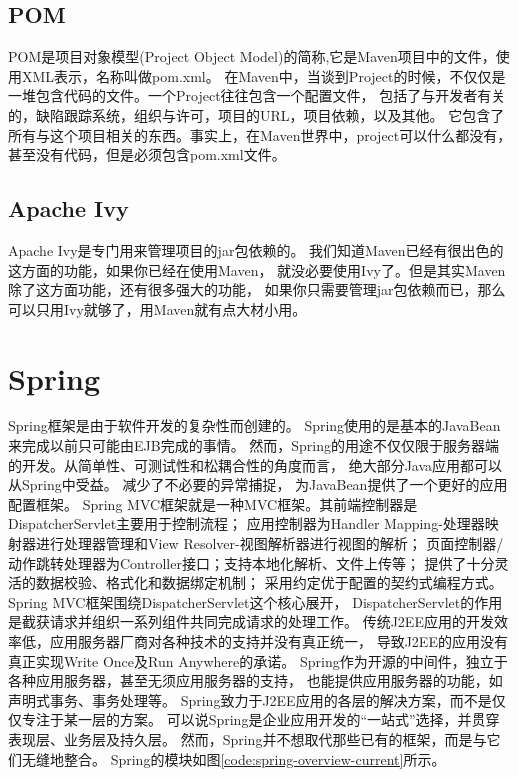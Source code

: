 \documentclass{book}
\begin{document}
\subsection{POM}

POM是项目对象模型(Project Object Model)的简称,它是Maven项目中的文件，使用XML表示，名称叫做pom.xml。
在Maven中，当谈到Project的时候，不仅仅是一堆包含代码的文件。一个Project往往包含一个配置文件，
包括了与开发者有关的，缺陷跟踪系统，组织与许可，项目的URL，项目依赖，以及其他。
它包含了所有与这个项目相关的东西。事实上，在Maven世界中，project可以什么都没有，甚至没有代码，但是必须包含pom.xml文件。

\subsection{Apache Ivy}

Apache Ivy是专门用来管理项目的jar包依赖的。
我们知道Maven已经有很出色的这方面的功能，如果你已经在使用Maven，
就没必要使用Ivy了。但是其实Maven除了这方面功能，还有很多强大的功能，
如果你只需要管理jar包依赖而已，那么可以只用Ivy就够了，用Maven就有点大材小用。

\section{Spring}

Spring框架是由于软件开发的复杂性而创建的。
Spring使用的是基本的JavaBean来完成以前只可能由EJB完成的事情。
然而，Spring的用途不仅仅限于服务器端的开发。从简单性、可测试性和松耦合性的角度而言，
绝大部分Java应用都可以从Spring中受益。
减少了不必要的异常捕捉，
为JavaBean提供了一个更好的应用配置框架。
Spring MVC框架就是一种MVC框架。其前端控制器是DispatcherServlet主要用于控制流程；
应用控制器为Handler Mapping-处理器映射器进行处理器管理和View Resolver-视图解析器进行视图的解析；
页面控制器/动作跳转处理器为Controller接口；支持本地化解析、文件上传等；
提供了十分灵活的数据校验、格式化和数据绑定机制；
采用约定优于配置的契约式编程方式。 
Spring MVC框架围绕DispatcherServlet这个核心展开，
DispatcherServlet的作用是截获请求并组织一系列组件共同完成请求的处理工作。
传统J2EE应用的开发效率低，应用服务器厂商对各种技术的支持并没有真正统一，
导致J2EE的应用没有真正实现Write Once及Run Anywhere的承诺。
Spring作为开源的中间件，独立于各种应用服务器，甚至无须应用服务器的支持，
也能提供应用服务器的功能，如声明式事务、事务处理等。
Spring致力于J2EE应用的各层的解决方案，而不是仅仅专注于某一层的方案。
可以说Spring是企业应用开发的“一站式”选择，并贯穿表现层、业务层及持久层。
然而，Spring并不想取代那些已有的框架，而是与它们无缝地整合。
Spring的模块如图\ref{code:spring-overview-current}所示。
\end{document}
